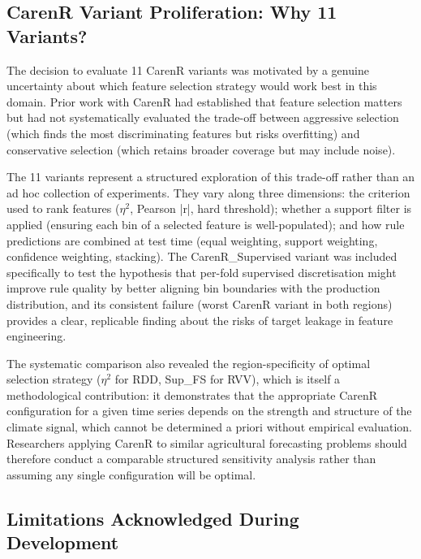 \subsection{CarenR Variant Proliferation: Why 11 Variants?}\label{sub:carenr_variant_proliferation_why}

The decision to evaluate 11 CarenR variants was motivated by a genuine uncertainty about which feature selection strategy would work best in this domain. Prior work with CarenR had established that feature selection matters but had not systematically evaluated the trade-off between aggressive selection (which finds the most discriminating features but risks overfitting) and conservative selection (which retains broader coverage but may include noise).

The 11 variants represent a structured exploration of this trade-off rather than an ad hoc collection of experiments. They vary along three dimensions: the criterion used to rank features ($\eta$$^2$, Pearson |r|, hard threshold); whether a support filter is applied (ensuring each bin of a selected feature is well-populated); and how rule predictions are combined at test time (equal weighting, support weighting, confidence weighting, stacking). The CarenR\_Supervised variant was included specifically to test the hypothesis that per-fold supervised discretisation might improve rule quality by better aligning bin boundaries with the production distribution, and its consistent failure (worst CarenR variant in both regions) provides a clear, replicable finding about the risks of target leakage in feature engineering.

The systematic comparison also revealed the region-specificity of optimal selection strategy ($\eta$$^2$ for RDD, Sup\_FS for RVV), which is itself a methodological contribution: it demonstrates that the appropriate CarenR configuration for a given time series depends on the strength and structure of the climate signal, which cannot be determined a priori without empirical evaluation. Researchers applying CarenR to similar agricultural forecasting problems should therefore conduct a comparable structured sensitivity analysis rather than assuming any single configuration will be optimal.


\subsection{Limitations Acknowledged During Development}\label{sub:limitations_acknowledged_during_development}

